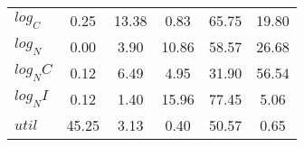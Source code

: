\begin{center}
\begin{longtable}{lccccc}
$log_C         $	 & 	        0.25	 & 	       13.38	 & 	        0.83	 & 	       65.75	 & 	       19.80 \\ 
$log_N         $	 & 	        0.00	 & 	        3.90	 & 	       10.86	 & 	       58.57	 & 	       26.68 \\ 
$log_NC        $	 & 	        0.12	 & 	        6.49	 & 	        4.95	 & 	       31.90	 & 	       56.54 \\ 
$log_NI        $	 & 	        0.12	 & 	        1.40	 & 	       15.96	 & 	       77.45	 & 	        5.06 \\ 
$util          $	 & 	       45.25	 & 	        3.13	 & 	        0.40	 & 	       50.57	 & 	        0.65 \\ 
\end{longtable}
 \end{center}
